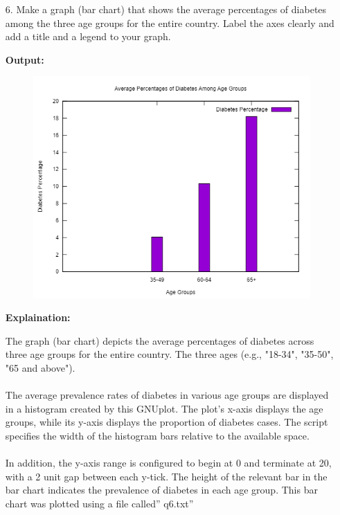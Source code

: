 \begin{enumerate}
	\item[6.] {Make a graph (bar chart) that shows the average percentages of diabetes among the three age groups for the entire country. Label the axes clearly and add a title and a legend to your graph.}
	\item[\textbf{Output:}]
	\item[] {\begin{figure}[H]
		\includegraphics[width=12.75cm]{Q6.png}
		\end{figure}}
	\item[\textbf{Explaination:}]
	\item[] {The graph (bar chart) depicts the average percentages of diabetes across three age groups for the entire country. The three ages  (e.g., "18-34", "35-50", "65 and above").\\ \\ The average prevalence rates of diabetes in various age groups are displayed in a histogram created by this GNUplot. The plot's x-axis displays the age groups, while its y-axis displays the proportion of diabetes cases. The script specifies the width of the histogram bars relative to the available space.\\ \\ In addition, the y-axis range is configured to begin at 0 and terminate at 20, with a 2 unit gap between each y-tick. The height of the relevant bar in the bar chart indicates the prevalence of diabetes in each age group. This bar chart was plotted using a file called” q6.txt”
}
\end{enumerate}

